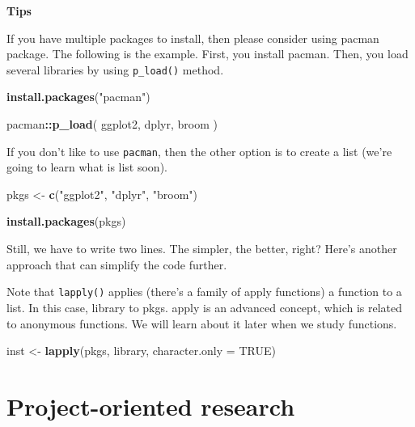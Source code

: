 \documentclass[
]{book}
\newenvironment{Shaded}{\begin{snugshade}}{\end{snugshade}}
\newcommand{\DataTypeTok}[1]{\textcolor[rgb]{0.13,0.29,0.53}{#1}}
\newcommand{\KeywordTok}[1]{\textcolor[rgb]{0.13,0.29,0.53}{\textbf{#1}}}
\newcommand{\NormalTok}[1]{#1}
\newcommand{\OperatorTok}[1]{\textcolor[rgb]{0.81,0.36,0.00}{\textbf{#1}}}
\newcommand{\OtherTok}[1]{\textcolor[rgb]{0.56,0.35,0.01}{#1}}
\newcommand{\StringTok}[1]{\textcolor[rgb]{0.31,0.60,0.02}{#1}}
\begin{document}
\textbf{Tips}

If you have multiple packages to install, then please consider using pacman package. The following is the example. First, you install pacman. Then, you load several libraries by using \texttt{p\_load()} method.

\begin{Shaded}
\begin{Highlighting}[]
\KeywordTok{install.packages}\NormalTok{(}\StringTok{"pacman"}\NormalTok{)}

\NormalTok{pacman}\OperatorTok{::}\KeywordTok{p\_load}\NormalTok{(}
\NormalTok{  ggplot2,}
\NormalTok{  dplyr, }
\NormalTok{  broom}
\NormalTok{)}
\end{Highlighting}
\end{Shaded}

If you don't like to use \texttt{pacman}, then the other option is to create a list (we're going to learn what is list soon).

\begin{Shaded}
\begin{Highlighting}[]
\NormalTok{pkgs \textless{}{-}}\StringTok{ }\KeywordTok{c}\NormalTok{(}\StringTok{"ggplot2"}\NormalTok{, }\StringTok{"dplyr"}\NormalTok{, }\StringTok{"broom"}\NormalTok{)}

\KeywordTok{install.packages}\NormalTok{(pkgs)}
\end{Highlighting}
\end{Shaded}

Still, we have to write two lines. The simpler, the better, right? Here's another approach that can simplify the code further.

Note that \texttt{lapply()} applies (there's a family of apply functions) a function to a list. In this case, library to pkgs. apply is an advanced concept, which is related to anonymous functions. We will learn about it later when we study functions.

\begin{Shaded}
\begin{Highlighting}[]
\NormalTok{inst \textless{}{-}}\StringTok{ }\KeywordTok{lapply}\NormalTok{(pkgs, library, }
               \DataTypeTok{character.only =} \OtherTok{TRUE}\NormalTok{)}
\end{Highlighting}
\end{Shaded}

\hypertarget{project-oriented-research}{%
\section{Project-oriented research}\label{project-oriented-research}}
\end{document}
